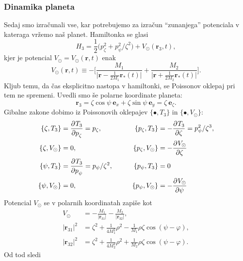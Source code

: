 \documentclass[12pt, a4paper]{article}
\renewcommand{\r}{
    \ensuremath{\mathbf{r}}
}
\newcommand{\ee}{
    \ensuremath{\mathbf{e}}
}
\newcommand{\der}[3][]{
    \ensuremath{ \frac{\partial^{#1} #2}{\partial #3^{#1}} }
}
\begin{document}
\subsubsection{Dinamika planeta}
Sedaj smo izra\v cunali vse, kar potrebujemo za izra\v cun "`zunanjega"' potenciala v kateraga vr\v zemo na\v s planet.
Hamiltonka se glasi
\begin{equation}
    H_3 = \frac{1}{2}\big(p_\zeta^2 + p_\psi^2/\zeta^2\big) + V_\odot(\r_3,t),
\end{equation}
kjer je potencial $V_\odot = V_\odot(\r, t)$ enak
\begin{equation}
    V_\odot (\r, t) \equiv -\Bigg[\frac{M_1}{\big|\r - \frac{1}{2M_1}\r_*(t)\big|}
        + \frac{M_2}{\big|\r + \frac{1}{2M_2}\r_*(t)\big|}\Bigg].
\end{equation}
Kljub temu, da \v cas eksplicitno nastopa v hamiltonki, se Poissonov oklepaj pri tem ne spremeni. Uvedli smo \v se
polarne koordinate planeta:
\[
    \r_3 = \zeta\cos\psi\ \ee_x + \zeta\sin\psi\ \ee_y = \zeta\ \ee_\zeta.
\]
Gibalne zakone dobimo iz Poissonovih oklepajev $\{\bullet, T_3\}$ in $\{\bullet, V_\odot\}$:
\begin{alignat}{3}
    \{\zeta, T_3\}        &= \der{T_3}{p_\zeta} = p_\zeta, \qquad&
    \{p_\zeta, T_3\} &= -\der{T_3}{\zeta} = p^2_\psi/\zeta^3, \notag \\
    \{\zeta, V_\odot\}    &= 0, \qquad&
    \{p_\zeta, V_\odot\}  &= -\der{V_\odot}{\zeta} \notag \\
    \{\psi, T_3\}         &= \der{T_3}{p_\psi} = p_\psi/\zeta^2, \qquad&
    \{p_\psi, T_3\}       &= 0 \notag \\
    \{\psi, V_\odot\}     &= 0, \qquad&
    \{p_\psi, V_\odot\}   &= -\der{V_\odot}{\psi}
    \label{oklepaji}
\end{alignat}
Potencial $V_\odot$ se v polarnih koordinatah zapi\v se kot
\begin{align}
    V_\odot     &= -\frac{M_1}{|\r_{31}|} -\frac{M_2}{|\r_{32}|}, \\
    |\r_{31}|^2 &= \zeta^2 + \frac{1}{4M_1^2}\rho^2 - \frac{1}{M_1}\rho\zeta\cos(\psi - \varphi), \\
    |\r_{32}|^2 &= \zeta^2 + \frac{1}{4M_2^2}\rho^2 + \frac{1}{M_2}\rho\zeta\cos(\psi - \varphi).
\end{align}
Od tod sledi
\end{document}
